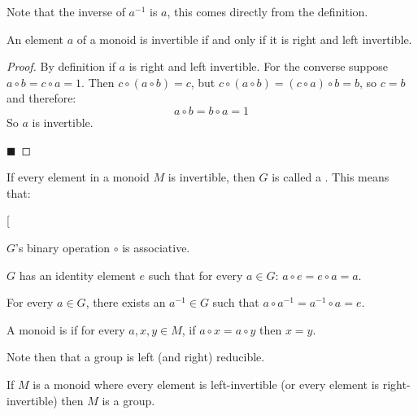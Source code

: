 \documentclass[10pt]{article}
\makeatletter
\def\@blist[#1]{%
    \bgroup\bgroup\par\vskip-\medskipamount%
    \gdef\item{%
        \par\egroup\bgroup\medskip\setbox0=\hbox{#1\quad}%
        \advance\leftskip by \wd0\leavevmode\kern-\wd0\box0%
    }%
}
\def\blist{\@ifnextchar[ \@blist {\@blist[$\bullet$]}}
\def\elist{\par\egroup\egroup\medskip}
\makeatother
\begin{document}
Note that the inverse of $a^{-1}$ is $a$, this comes directly from the definition.

\begin{prop*}

    An element $a$ of a monoid is invertible if and only if it is right and left invertible.

\end{prop*}

\begin{proof}

    By definition if $a$ is right and left invertible.
    For the converse suppose $a\circ b=c\circ a=1$.
    Then $c\circ(a\circ b)=c$, but $c\circ(a\circ b)=(c\circ a)\circ b=b$, so $c=b$ and therefore:
        \[ a\circ b = b\circ a = 1 \]
    So $a$ is invertible.

    \hfill$\blacksquare$

\end{proof}

\begin{defn*}

    If every element in a monoid $M$ is invertible, then $G$ is called a .
    This means that:

        \blist
            \item $G$'s binary operation $\circ$ is associative.
            \item $G$ has an identity element $e$ such that for every $a\in G$: $a\circ e=e\circ a=a$.
            \item For every $a\in G$, there exists an $a^{-1}\in G$ such that $a\circ a^{-1}=a^{-1}\circ a=e$.
        \elist

\end{defn*}

\begin{defn*}

    A monoid is  if for every $a,x,y\in M$, if $a\circ x=a\circ y$ then $x=y$.

\end{defn*}

Note then that a group is left (and right) reducible.

\begin{prop*}

    If $M$ is a monoid where every element is left-invertible (or every element is right-invertible) then $M$ is a group.

\end{prop*}
\end{document}
